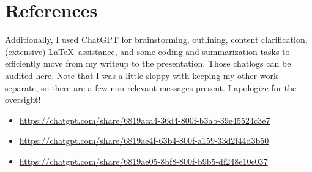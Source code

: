 \documentclass[11pt]{article}
\begin{document}
\section{References}
\printbibliography[heading=none]
Additionally, I used ChatGPT for brainstorming, outlining, content clarification, (extensive) \LaTeX\ assistance, and some coding and summarization tasks to efficiently move from my writeup to the presentation.
Those chatlogs can be audited here. Note that I was a little sloppy with keeping my other work separate, so there are a few non-relevant messages present. I apologize for the oversight!
\begin{itemize}
    \item \href{https://chatgpt.com/share/6819aca4-36d4-800f-b3ab-39e45524c3e7}{https://chatgpt.com/share/6819aca4-36d4-800f-b3ab-39e45524c3e7}
    \item \href{https://chatgpt.com/share/6819ae4f-63b4-800f-a159-33d2f44d3b50}{https://chatgpt.com/share/6819ae4f-63b4-800f-a159-33d2f44d3b50}
    \item \href{https://chatgpt.com/share/6819ae05-8bf8-800f-b9b5-df248e10e037}{https://chatgpt.com/share/6819ae05-8bf8-800f-b9b5-df248e10e037}
\end{itemize}
\end{document}
